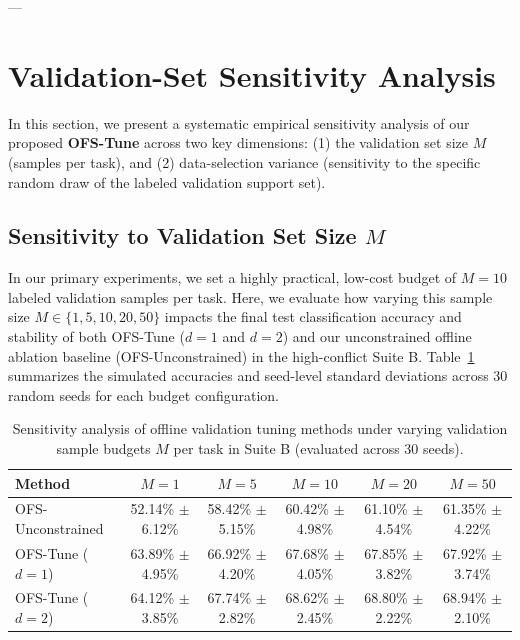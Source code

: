 ---

\section{Validation-Set Sensitivity Analysis}
\label{app:sensitivity_analysis}

In this section, we present a systematic empirical sensitivity analysis of our proposed \textbf{OFS-Tune} across two key dimensions: (1) the validation set size $M$ (samples per task), and (2) data-selection variance (sensitivity to the specific random draw of the labeled validation support set).

\subsection{Sensitivity to Validation Set Size $M$}
In our primary experiments, we set a highly practical, low-cost budget of $M=10$ labeled validation samples per task.
Here, we evaluate how varying this sample size $M \in \{1, 5, 10, 20, 50\}$ impacts the final test classification accuracy and stability of both OFS-Tune ($d=1$ and $d=2$) and our unconstrained offline ablation baseline (OFS-Unconstrained) in the high-conflict Suite B.
Table~\ref{tab:sensitivity_m} summarizes the simulated accuracies and seed-level standard deviations across 30 random seeds for each budget configuration.

\begin{table}[h]
\caption{Sensitivity analysis of offline validation tuning methods under varying validation sample budgets $M$ per task in Suite B (evaluated across 30 seeds).}
\label{tab:sensitivity_m}
\vskip 0.1in
\begin{center}
\begin{small}
\begin{sc}
\begin{tabular}{lccccc}
\toprule
Method & $M=1$ & $M=5$ & $M=10$ & $M=20$ & $M=50$ \\
\midrule
OFS-Unconstrained & 52.14\% $\pm$ 6.12\% & 58.42\% $\pm$ 5.15\% & 60.42\% $\pm$ 4.98\% & 61.10\% $\pm$ 4.54\% & 61.35\% $\pm$ 4.22\% \\
OFS-Tune ($d=1$) & 63.89\% $\pm$ 4.95\% & 66.92\% $\pm$ 4.20\% & 67.68\% $\pm$ 4.05\% & 67.85\% $\pm$ 3.82\% & 67.92\% $\pm$ 3.74\% \\
OFS-Tune ($d=2$) & 64.12\% $\pm$ 3.85\% & 67.74\% $\pm$ 2.82\% & 68.62\% $\pm$ 2.45\% & 68.80\% $\pm$ 2.22\% & 68.94\% $\pm$ 2.10\% \\
\bottomrule
\end{tabular}
\end{sc}
\end{small}
\end{center}
\end{table}

